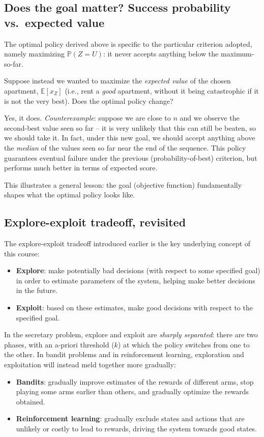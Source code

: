 \subsection{Does the goal matter? Success probability vs.\ expected value}

The optimal policy derived above is specific to the particular criterion adopted, namely maximizing $\mathbb{P}(Z = U)$: it never accepts anything below the maximum-so-far.

Suppose instead we wanted to maximize the \emph{expected value} of the chosen apartment, $\mathbb{E}[x_Z]$ (i.e., rent a \emph{good} apartment, without it being catastrophic if it is not the very best). Does the optimal policy change?

\begin{remark}
Yes, it does. \emph{Counterexample}: suppose we are close to $n$ and we observe the second-best value seen so far -- it is very unlikely that this can still be beaten, so we should take it. In fact, under this new goal, we should accept anything above the \emph{median} of the values seen so far near the end of the sequence. This policy guarantees eventual failure under the previous (probability-of-best) criterion, but performs much better in terms of expected score.
\end{remark}

This illustrates a general lesson: the goal (objective function) fundamentally shapes what the optimal policy looks like.

\subsection{Explore-exploit tradeoff, revisited}

The explore-exploit tradeoff introduced earlier is the key underlying concept of this course:
\begin{itemize}
    \item \textbf{Explore}: make potentially bad decisions (with respect to some specified goal) in order to estimate parameters of the system, helping make better decisions in the future.
    \item \textbf{Exploit}: based on these estimates, make good decisions with respect to the specified goal.
\end{itemize}

In the secretary problem, explore and exploit are \emph{sharply separated}: there are two phases, with an a-priori threshold ($k$) at which the policy switches from one to the other. In bandit problems and in reinforcement learning, exploration and exploitation will instead meld together more gradually:
\begin{itemize}
    \item \textbf{Bandits}: gradually improve estimates of the rewards of different arms, stop playing some arms earlier than others, and gradually optimize the rewards obtained.
    \item \textbf{Reinforcement learning}: gradually exclude states and actions that are unlikely or costly to lead to rewards, driving the system towards good states.
\end{itemize}
 \newpage
